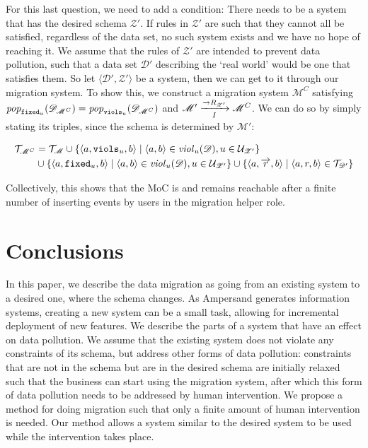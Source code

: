 \documentclass[runningheads]{llncs}
\newcommand{\id}[1]{\text{\it #1\/}}
\newcommand{\popF}[1]{\id{pop}_{#1}}
\newcommand{\pop}[2]{\popF{#1}(#2)}
\newcommand{\viol}[2]{\violC{#1}(#2)}
\newcommand{\violC}[1]{\id{viol}_{#1}}
\newcommand{\pair}[2]{\langle{#1},{#2}\rangle}
\newcommand{\triple}[3]{\langle{#1},{#2},{#3}\rangle}
\newcommand{\rels}{\mathcal{R}}   %
\newcommand{\triples}{\mathcal{T}}
\newcommand{\rules}{\mathcal{U}}
\newcommand{\dataset}{\mathscr{D}}
\newcommand{\schema}{\mathscr{Z}}
\newcommand{\migrsys}{\mathscr{M}}
\begin{document}
   For this last question, we need to add a condition:
   There needs to be a system that has the desired schema $\schema'$.
   If rules in $\schema'$ are such that they cannot all be satisfied, regardless of the data set, no such system exists and we have no hope of reaching it.
   We assume that the rules of $\schema'$ are intended to prevent data pollution, such that a data set $\dataset'$ describing the `real world' would be one that satisfies them.
   So let $\pair{\dataset'}{\schema'}$ be a system, then we can get to it through our migration system.
   To show this, we construct a migration system $\migrsys^C$ satisfying $\pop{{\tt fixed}_u}{\dataset_{\migrsys^C}}=\pop{{\tt viols}_u}{\dataset_{\migrsys^C}}$ and $\migrsys'\xrightarrow[I]{\overrightarrow\rels_{\schema'}} \migrsys^C$.
   We can do so by simply stating its triples, since the schema is determined by $\migrsys'$:
   
\begin{align}
   \begin{aligned}
   \triples_{\migrsys^C} &= \triples_\migrsys 
   \cup  \{\triple{a}{{\tt viols}_u}{b} \mid \pair{a}{b}\in \viol{u}{\dataset}, u\in \rules_{\schema'} \} \\
   &\cup \{\triple{a}{{\tt fixed}_u}{b} \mid \pair{a}{b}\in \viol{u}{\dataset}, u\in \rules_{\schema'} \}
   \cup \{\triple{a}{\overrightarrow{r}}{b} \mid \triple{a}{r}{b}\in\triples_{\dataset'}\}   
   \end{aligned}
\end{align}
   
   Collectively, this shows that the MoC is and remains reachable after a finite number of inserting events by users in the migration helper role.
   
\section{Conclusions}
\label{sct:Conclusions}
   In this paper, we describe the data migration as going from an existing system to a desired one, where the schema changes.
   As Ampersand generates information systems, creating a new system can be a small task, allowing for incremental deployment of new features.
   We describe the parts of a system that have an effect on data pollution.
   We assume that the existing system does not violate any constraints of its schema, but address other forms of data pollution:
   constraints that are not in the schema but are in the desired schema are initially relaxed such that the business can start using the migration system, after which this form of data pollution needs to be addressed by human intervention.
   We propose a method for doing migration such that only a finite amount of human intervention is needed.
   Our method allows a system similar to the desired system to be used while the intervention takes place.
\end{document}
